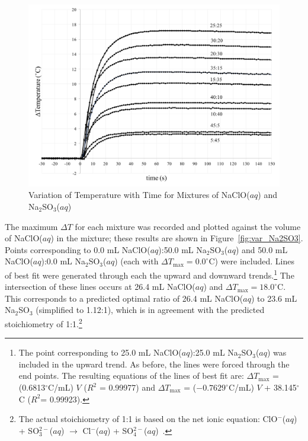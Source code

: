 \begin{figure}[htbp]
\centering
\includegraphics[width=\textwidth]{Temperature_Profiles_Na2SO3_BW.png}
\caption{Variation of Temperature with Time for Mixtures of NaClO($aq$) and Na$_2$SO$_3$($aq$)}
\label{fig:temp_Na2SO3}
\end{figure}

The maximum $\Delta T$ for each mixture was recorded and plotted 
against the volume of NaClO($aq$) in the mixture; these results are shown in Figure~\ref{fig:var_Na2SO3}.  
Points corresponding to 0.0 mL NaClO($aq$):50.0 mL Na$_2$SO$_3$($aq$) and 50.0 mL NaClO($aq$):0.0 mL Na$_2$SO$_3$($aq$) 
(each with $\Delta T_\mathrm{max} = 0.0^\circ$C) were included.  Lines of best fit were generated through each the upward and downward 
trends.\footnote{The point corresponding to 25.0 mL NaClO($aq$):25.0 mL Na$_2$SO$_3$($aq$) was included in the upward trend.  
As before, the lines were forced through the end points.  The resulting equations of the lines of best fit 
are: $\Delta T_\mathrm{max}$ = (0.6813$^\circ$C/mL) $V$ ($R^2$ = 0.99977) and $\Delta T_\mathrm{max}$ = ($-0.7629^\circ$C/mL) $V$ + 38.145$^\circ$C ($R^2$= 0.99923).}  
The intersection of these lines occurs at 26.4 mL NaClO($aq$) and $\Delta T_\mathrm{max} = 18.0^\circ$C.  This 
corresponds to a predicted optimal ratio of 26.4 mL NaClO($aq$) to 23.6 mL Na$_2$SO$_3$ (simplified to 1.12:1), 
which is in agreement with the predicted stoichiometry of 1:1.\footnote{The actual stoichiometry of 1:1 is 
based on the net ionic equation: ClO$^-$($aq$) + SO$_3^{2-}$($aq$) $\rightarrow$ Cl$^-$($aq$) + SO$_4^{2-}$($aq$)~\cite{vonderbrink}.}

